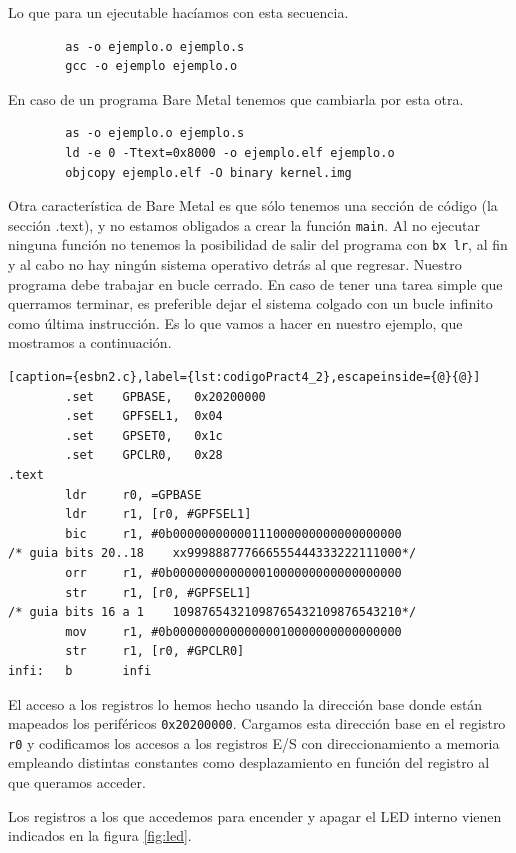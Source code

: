 Lo que para un ejecutable hacíamos con esta secuencia.
\begin{lstlisting}
        as -o ejemplo.o ejemplo.s
        gcc -o ejemplo ejemplo.o
\end{lstlisting}

En caso de un programa Bare Metal tenemos que cambiarla por esta otra.
\begin{lstlisting}
        as -o ejemplo.o ejemplo.s
        ld -e 0 -Ttext=0x8000 -o ejemplo.elf ejemplo.o
        objcopy ejemplo.elf -O binary kernel.img
\end{lstlisting}

Otra característica de Bare Metal es que sólo tenemos una sección de código (la sección
.text), y no estamos obligados a crear la función
{\tt main}. Al no ejecutar ninguna función no tenemos la posibilidad de salir del
programa con {\tt bx lr}, al fin y al cabo no hay ningún sistema operativo detrás al
que regresar. Nuestro programa debe trabajar en bucle cerrado. En caso de tener una
tarea simple que querramos terminar, es preferible dejar el sistema colgado con un
bucle infinito como última instrucción. Es lo que vamos a hacer en nuestro ejemplo,
que mostramos a continuación.

\begin{lstlisting}[caption={esbn2.c},label={lst:codigoPract4_2},escapeinside={@}{@}]
        .set    GPBASE,   0x20200000
        .set    GPFSEL1,  0x04
        .set    GPSET0,   0x1c
        .set    GPCLR0,   0x28
.text
        ldr     r0, =GPBASE
        ldr     r1, [r0, #GPFSEL1]
        bic     r1, #0b00000000000111000000000000000000
/* guia bits 20..18    xx999888777666555444333222111000*/
        orr     r1, #0b00000000000001000000000000000000
        str     r1, [r0, #GPFSEL1]
/* guia bits 16 a 1    10987654321098765432109876543210*/
        mov     r1, #0b00000000000000010000000000000000
        str     r1, [r0, #GPCLR0]
infi:   b       infi
\end{lstlisting}

El acceso a los registros lo hemos hecho usando la dirección base donde
están mapeados los periféricos {\tt 0x20200000}. Cargamos esta dirección
base en el registro {\tt r0} y codificamos los accesos a los registros
E/S con direccionamiento a memoria empleando distintas constantes como
desplazamiento en función del registro al que queramos acceder.

Los registros a los que accedemos para encender y apagar el LED interno vienen indicados
en la figura \ref{fig:led}.

